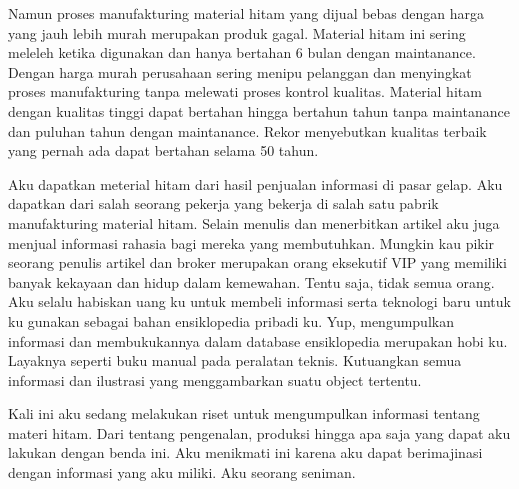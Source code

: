 Namun proses manufakturing material hitam yang dijual bebas dengan harga yang jauh lebih murah merupakan produk gagal. Material hitam ini sering meleleh ketika digunakan dan hanya bertahan 6 bulan dengan maintanance. Dengan harga murah perusahaan sering menipu pelanggan dan menyingkat proses manufakturing tanpa melewati proses kontrol kualitas. Material hitam dengan kualitas tinggi dapat bertahan hingga bertahun tahun tanpa maintanance dan puluhan tahun dengan maintanance. Rekor menyebutkan kualitas terbaik yang pernah ada dapat bertahan selama 50 tahun.

Aku dapatkan meterial hitam dari hasil penjualan informasi di pasar gelap. Aku dapatkan dari salah seorang pekerja yang bekerja di salah satu pabrik manufakturing material hitam. Selain menulis dan menerbitkan artikel aku juga menjual informasi rahasia bagi mereka yang membutuhkan. Mungkin kau pikir seorang penulis artikel dan broker merupakan orang eksekutif VIP yang memiliki banyak kekayaan dan hidup dalam kemewahan. Tentu saja, tidak semua orang. Aku selalu habiskan uang ku untuk membeli informasi serta teknologi baru untuk ku gunakan sebagai bahan ensiklopedia pribadi ku. Yup, mengumpulkan informasi dan membukukannya dalam database ensiklopedia merupakan hobi ku. Layaknya seperti buku manual pada peralatan teknis. Kutuangkan semua informasi dan ilustrasi yang menggambarkan suatu object tertentu.

Kali ini aku sedang melakukan riset untuk mengumpulkan informasi tentang materi hitam. Dari tentang pengenalan, produksi hingga apa saja yang dapat aku lakukan dengan benda ini. Aku menikmati ini karena aku dapat berimajinasi dengan informasi yang aku miliki. Aku seorang seniman.

